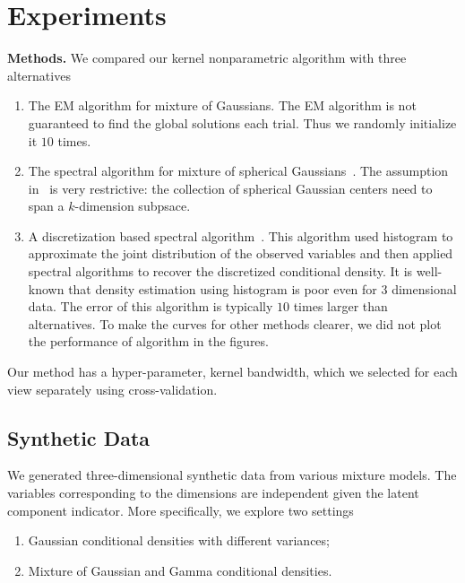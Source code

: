 \documentclass{article}
\begin{document}
\section{Experiments}

{\bf Methods.} We compared our kernel nonparametric algorithm with three alternatives
\begin{enumerate}
  \item The EM algorithm for mixture of Gaussians. The EM algorithm is not guaranteed to find the global solutions each trial. Thus we randomly initialize it $10$ times.
  \item The spectral algorithm for mixture of spherical Gaussians~\citep{Hsu13}. The assumption in~\citet{Hsu13} is very restrictive: the collection of spherical Gaussian centers need to span a $k$-dimension subpsace.
  \item A discretization based spectral algorithm~\citep{Hiroyuki10}. This algorithm used histogram to approximate the joint distribution of the observed variables and then applied spectral algorithms to recover the discretized conditional density. It is well-known that density estimation using histogram is poor even for 3 dimensional data. The error of this algorithm is typically $10$ times larger than alternatives. To make the curves for other methods clearer, we did not plot the performance of \citet{Hiroyuki10} algorithm in the figures.
\end{enumerate}
Our method has a hyper-parameter, kernel bandwidth, which we selected for each view separately using cross-validation.

\subsection{Synthetic Data}

We generated three-dimensional synthetic data from various mixture models. The variables corresponding to the dimensions are independent given the latent component indicator. More specifically, we explore two settings
\begin{enumerate}
  \item Gaussian conditional densities with different variances;
  \item Mixture of Gaussian and  Gamma conditional densities.
\end{enumerate}
\end{document}
